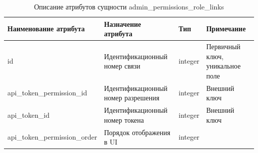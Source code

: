 \documentclass{mirea}
\begin{document}
	\begin{longtable}{ |p{}|p{}|p{}|p{}| } 
		\caption{Описание атрибутов сущности admin\_permissions\_role\_links}
		\endfirsthead
		\endhead
		\hline
		Наименование атрибута & Назначение атрибута & Тип & Примечание \\ \hline
		
		id & Идентификацион\-ный номер связи & integer & Первичный ключ, уникальное поле \\ \hline
		
		api\_token\-\_permission\-\_id & Идентификационный номер разрешения & integer & Внешний ключ \\ \hline
		
		api\_token\_id & Идентификационный номер токена & integer & Внешний ключ \\ \hline
		
		api\_token\-\_permission\-\_order & Порядок отображения в UI & integer & \\ \hline
		
	\end{longtable}
\end{document}
